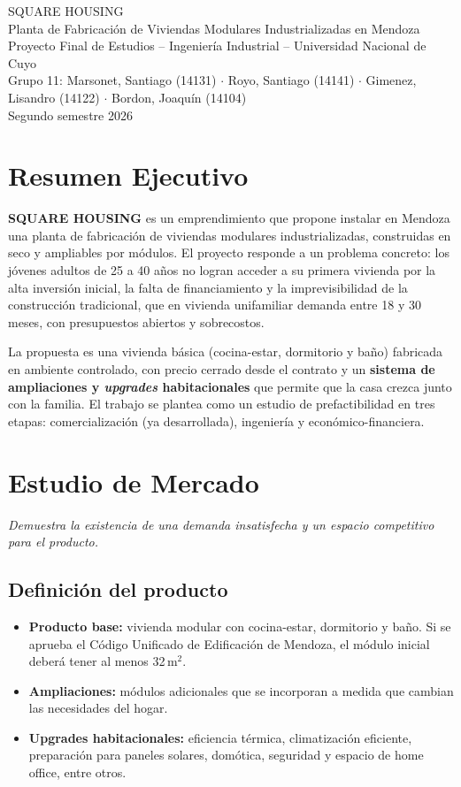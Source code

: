 \documentclass[11pt,a4paper]{article}
\begin{document}
\begin{center}
{\LARGE SQUARE HOUSING}\\[0.4em]
{\large Planta de Fabricación de Viviendas Modulares Industrializadas en Mendoza}\\[0.8em]
{\small Proyecto Final de Estudios -- Ingeniería Industrial -- Universidad Nacional de Cuyo}\\[0.2em]
{\small Grupo 11: Marsonet, Santiago (14131) $\cdot$ Royo, Santiago (14141) $\cdot$ Gimenez, Lisandro (14122) $\cdot$ Bordon, Joaquín (14104)}\\[0.2em]
{\small Segundo semestre 2026}
\end{center}

\vspace{0.6em}
\section*{Resumen Ejecutivo}

\textbf{SQUARE HOUSING} es un emprendimiento que propone instalar en Mendoza una planta de fabricación de viviendas modulares industrializadas, construidas en seco y ampliables por módulos. El proyecto responde a un problema concreto: los jóvenes adultos de 25 a 40 años no logran acceder a su primera vivienda por la alta inversión inicial, la falta de financiamiento y la imprevisibilidad de la construcción tradicional, que en vivienda unifamiliar demanda entre 18 y 30 meses, con presupuestos abiertos y sobrecostos.

La propuesta es una vivienda básica (cocina-estar, dormitorio y baño) fabricada en ambiente controlado, con precio cerrado desde el contrato y un \textbf{sistema de ampliaciones y \textit{upgrades} habitacionales} que permite que la casa crezca junto con la familia. El trabajo se plantea como un estudio de prefactibilidad en tres etapas: comercialización (ya desarrollada), ingeniería y económico-financiera.

\section{Estudio de Mercado}
\textit{Demuestra la existencia de una demanda insatisfecha y un espacio competitivo para el producto.}

\subsection{Definición del producto}
\begin{itemize}
  \item \textbf{Producto base:} vivienda modular con cocina-estar, dormitorio y baño. Si se aprueba el Código Unificado de Edificación de Mendoza, el módulo inicial deberá tener al menos 32\,m$^2$.
  \item \textbf{Ampliaciones:} módulos adicionales que se incorporan a medida que cambian las necesidades del hogar.
  \item \textbf{Upgrades habitacionales:} eficiencia térmica, climatización eficiente, preparación para paneles solares, domótica, seguridad y espacio de home office, entre otros.
\end{itemize}
\end{document}
